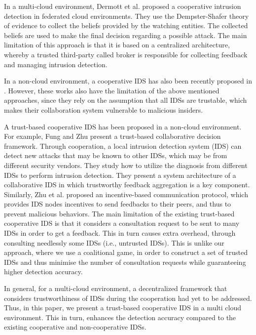 \documentclass[conference]{IEEEtran}
\begin{document}
In a multi-cloud environment, Dermott et al. \cite{dermott2015collaborative} proposed a cooperative intrusion detection in federated cloud environments. They use the Dempster-Shafer theory of evidence to collect the beliefs provided by the watching entities. The collected beliefs are used to make the final decision regarding a possible attack. The main limitation of this approach is that it is based on a centralized architecture, whereby a trusted third-party called broker is responsible for collecting feedback and managing intrusion detection.

In a non-cloud environment, a cooperative IDS has also been recently proposed in \cite{locasto2005towards} \cite{cordero2015community} \cite{yegneswaran2004global} \cite{cai2005collaborative} \cite{liu2015collaborative} \cite{patel2017nifty} \cite{huang2015openflow} \cite{sedjelmaci2015accurate}. However, these works also have the limitation of the above mentioned approaches, since they rely on the assumption that all IDSs are trustable, which makes their collaboration system vulnerable to malicious insiders.

A trust-based cooperative IDS has been proposed in a non-cloud environment. For example, Fung and Zhu \cite{fung2016facid} present a trust-based collaborative decision framework. Through cooperation, a local  intrusion detection system (IDS) can detect new attacks that may be known to other IDSs, which may be from different security vendors. They study how to utilize the diagnosis from different IDSs to perform intrusion detection. They present a system architecture of a collaborative IDS in which trustworthy feedback aggregation is a key component. Similarly, Zhu et al. \cite{zhu2009game} \cite{zhu2012guidex} proposed an incentive-based communication protocol, which provides IDS nodes incentives to send feedbacks to their peers, and thus to prevent malicious behaviors. The main limitation of the existing trust-based cooperative IDS is that it considers a consultation request to be sent to many IDSs in order to get a feedback. This in turn causes extra overhead, through consulting needlessly some IDSs (i.e., untrusted IDSs). This is unlike our approach, where we use a coalitional game, in order to construct a set of trusted IDSs and thus minimise the number of consultation requests while guaranteeing higher detection accuracy.

In general, for a multi-cloud environment, a decentralized framework that considers trustworthiness of IDSs during the cooperation had yet to be addressed. Thus, in this paper, we present a trust-based cooperative IDS in a multi cloud environment. This in turn, enhances the detection accuracy compared to the existing cooperative and non-cooperative IDSs.
\end{document}
